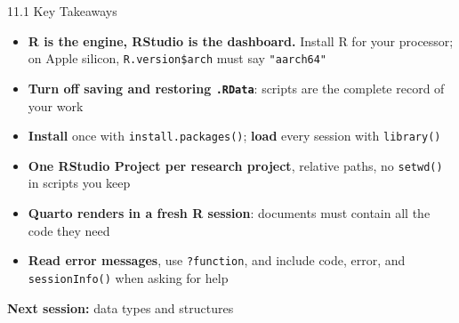 \documentclass[
  ignorenonframetext,
  aspectratio=169,
]{beamer}
\providecommand{\tightlist}{%
  \setlength{\itemsep}{0pt}\setlength{\parskip}{0pt}}
\begin{document}
\begin{frame}[fragile]{11.1 Key Takeaways}
\protect{}\label{key-takeaways}
\begin{itemize}
\tightlist
\item
  \textbf{R is the engine, RStudio is the dashboard.} Install R for your
  processor; on Apple silicon, \texttt{R.version\$arch} must say
  \texttt{"aarch64"}
\item
  \textbf{Turn off saving and restoring \texttt{.RData}}: scripts are
  the complete record of your work
\item
  \textbf{Install} once with \texttt{install.packages()}; \textbf{load}
  every session with \texttt{library()}
\item
  \textbf{One RStudio Project per research project}, relative paths, no
  \texttt{setwd()} in scripts you keep
\item
  \textbf{Quarto renders in a fresh R session}: documents must contain
  all the code they need
\item
  \textbf{Read error messages}, use \texttt{?function}, and include
  code, error, and \texttt{sessionInfo()} when asking for help
\end{itemize}

\textbf{Next session:} data types and structures
\end{frame}
\end{document}
